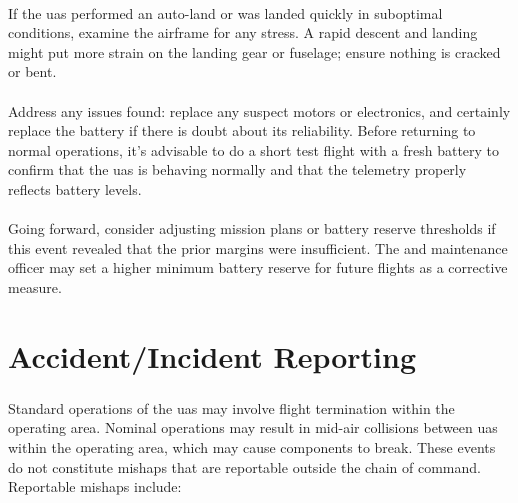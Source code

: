                 \paragraph{} If the \ac{uas} performed an auto-land or was landed quickly in suboptimal conditions, examine the airframe for any stress. A rapid descent and landing might put more strain on the landing gear or fuselage; ensure nothing is cracked or bent.
                
                \paragraph{} Address any issues found: replace any suspect motors or electronics, and certainly replace the battery if there is doubt about its reliability. Before returning to normal operations, it’s advisable to do a short test flight with a fresh battery to confirm that the \ac{uas} is behaving normally and that the telemetry properly reflects battery levels.
                
                \paragraph{} Going forward, consider adjusting mission plans or battery reserve thresholds if this event revealed that the prior margins were insufficient. The  and maintenance officer may set a higher minimum battery reserve for future flights as a corrective measure.
        
    \section{Accident/Incident Reporting}\label{sec:accidentreporting}

        \subsubsection{} Standard operations of the \ac{uas} may involve flight termination within the operating area. Nominal operations may result in mid-air collisions between \projectmars{} \ac{uas} within the operating area, which may cause components to break. These events do not constitute mishaps that are reportable outside the \projectmars{} chain of command. Reportable mishaps include:
        
